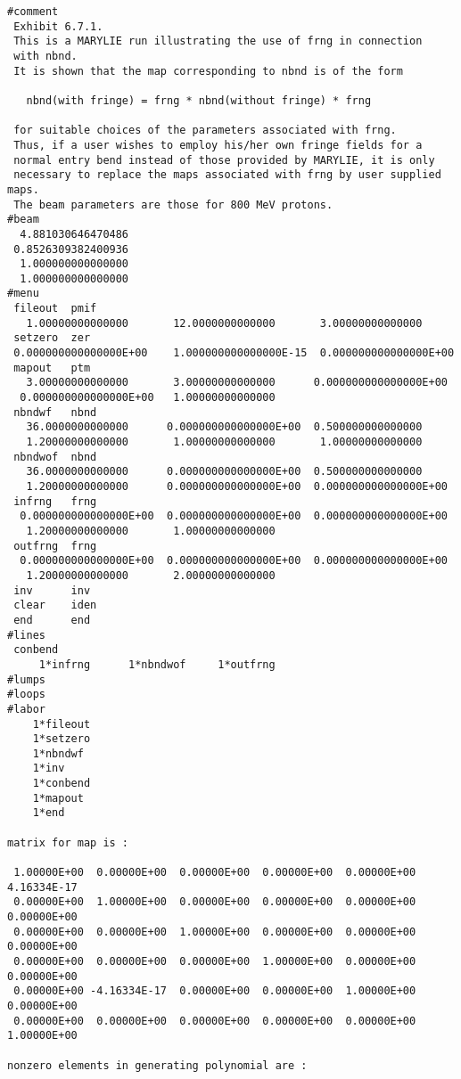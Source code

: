 \newpage
\begin{footnotesize}
\begin{verbatim}
#comment
 Exhibit 6.7.1.
 This is a MARYLIE run illustrating the use of frng in connection
 with nbnd.
 It is shown that the map corresponding to nbnd is of the form

   nbnd(with fringe) = frng * nbnd(without fringe) * frng

 for suitable choices of the parameters associated with frng.
 Thus, if a user wishes to employ his/her own fringe fields for a
 normal entry bend instead of those provided by MARYLIE, it is only
 necessary to replace the maps associated with frng by user supplied maps.
 The beam parameters are those for 800 MeV protons.
#beam
  4.881030646470486
 0.8526309382400936
  1.000000000000000
  1.000000000000000
#menu
 fileout  pmif
   1.00000000000000       12.0000000000000       3.00000000000000
 setzero  zer
 0.000000000000000E+00    1.000000000000000E-15  0.000000000000000E+00
 mapout   ptm
   3.00000000000000       3.00000000000000      0.000000000000000E+00
  0.000000000000000E+00   1.00000000000000
 nbndwf   nbnd
   36.0000000000000      0.000000000000000E+00  0.500000000000000
   1.20000000000000       1.00000000000000       1.00000000000000
 nbndwof  nbnd
   36.0000000000000      0.000000000000000E+00  0.500000000000000
   1.20000000000000      0.000000000000000E+00  0.000000000000000E+00
 infrng   frng
  0.000000000000000E+00  0.000000000000000E+00  0.000000000000000E+00
   1.20000000000000       1.00000000000000
 outfrng  frng
  0.000000000000000E+00  0.000000000000000E+00  0.000000000000000E+00
   1.20000000000000       2.00000000000000
 inv      inv
 clear    iden
 end      end
#lines
 conbend
     1*infrng      1*nbndwof     1*outfrng
#lumps
#loops
#labor
    1*fileout
    1*setzero
    1*nbndwf
    1*inv
    1*conbend
    1*mapout
    1*end

matrix for map is :

 1.00000E+00  0.00000E+00  0.00000E+00  0.00000E+00  0.00000E+00  4.16334E-17
 0.00000E+00  1.00000E+00  0.00000E+00  0.00000E+00  0.00000E+00  0.00000E+00
 0.00000E+00  0.00000E+00  1.00000E+00  0.00000E+00  0.00000E+00  0.00000E+00
 0.00000E+00  0.00000E+00  0.00000E+00  1.00000E+00  0.00000E+00  0.00000E+00
 0.00000E+00 -4.16334E-17  0.00000E+00  0.00000E+00  1.00000E+00  0.00000E+00
 0.00000E+00  0.00000E+00  0.00000E+00  0.00000E+00  0.00000E+00  1.00000E+00

nonzero elements in generating polynomial are :

\end{verbatim}
\end{footnotesize}

